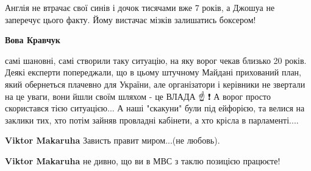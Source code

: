 \begin{itemize}

Англія не втрачає свої синів і дочок тисячами вже 7 років, а Джошуа не
заперечує цього факту. Йому вистачає мізків залишатись боксером!

\begin{itemize} %
\textbf{Вова Кравчук} 

самі шановні, самі створили таку ситуацію, на яку ворог чекав близько 20 років.
Деякі експерти попереджали, що в цьому штучному Майдані прихований план, який
обернеться плачевно для України, але організатори і керівники не звертали на це
уваги, вони йшли своїм шляхом - це ВЛАДА ☝ ️ ❗ А ворог просто скористався тією
ситуацією... А наші "скакуни" були під ейфорією, та велися на заклики тих, хто
потім зайняв провладні кабінети, а хто крісла в парламенті....


\textbf{Viktor Makaruha} Зависть правит миром...(не любовь).

\textbf{Viktor Makaruha} не дивно, що ви в МВС з таклю позицією працюєте!
\end{itemize} %

\end{itemize} %
